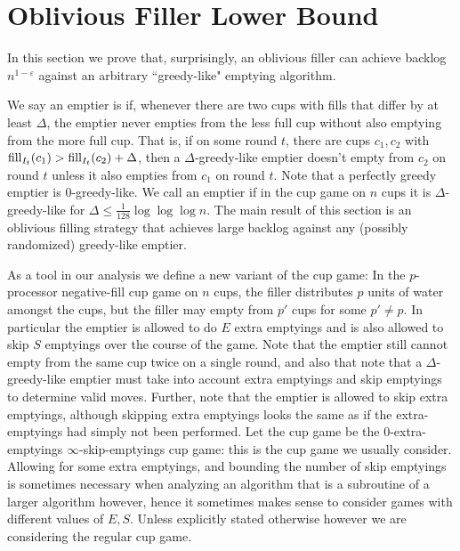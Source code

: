 \section{Oblivious Filler Lower Bound}\label{sec:oblivious}
In this section we prove that, surprisingly, an oblivious filler can
achieve backlog $n^{1-\varepsilon}$ against an arbitrary
``greedy-like" emptying algorithm.

We say an emptier is  if, whenever there
are two cups with fills that differ by at least $\Delta$, the emptier
never empties from the less full cup without also emptying from the
more full cup. That is, if on some round $t$, there are cups
$c_1, c_2$ with $\operatorname{\text{\textup{fill}}}_{I_t}(c_1) > \operatorname{\text{\textup{fill}}}_{I_t}(c_2) + \Delta$, then a
$\Delta$-greedy-like emptier doesn't empty from $c_2$ on round $t$
unless it also empties from $c_1$ on round $t$. Note that a perfectly
greedy emptier is $0$-greedy-like. We call an emptier
 if in the cup game on $n$ cups it is
$\Delta$-greedy-like for $\Delta \le \frac{1}{128} \log\log\log
n$. The main result of this section is an oblivious filling strategy
that achieves large backlog against any (possibly randomized)
greedy-like emptier.


As a tool in our analysis we define a new variant of the cup game: In
the $p$-processor  
negative-fill cup game on $n$ cups, the filler distributes $p$ units
of water amongst the cups, but the filler may empty from $p'$ cups for
some $p' \neq p$. In particular the emptier is allowed to do $E$ extra
emptyings and is also allowed to skip $S$ emptyings over the course of
the game. Note that the emptier still cannot empty from the same cup
twice on a single round, and also that note that a
$\Delta$-greedy-like emptier must take into account extra emptyings
and skip emptyings to determine valid moves. Further, note that the
emptier is allowed to skip extra emptyings, although skipping extra
emptyings looks the same as if the extra-emptyings had simply not been
performed.  Let the  cup game be the $0$-extra-emptyings
$\infty$-skip-emptyings cup game: this is the cup game we usually
consider.
Allowing for some extra emptyings, and bounding the number of skip
emptyings is sometimes necessary when analyzing an algorithm that is a
subroutine of a larger algorithm however, hence it sometimes makes
sense to consider games with different values of $E,S$. Unless
explicitly stated otherwise however we are considering the regular cup
game.

